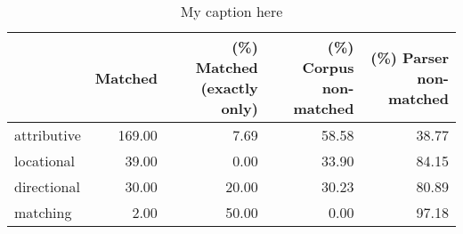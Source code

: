 \begin{table}[!ht]
\centering
\begin{tabular}{lrrrr}
\toprule
{} &  Matched &  (\%) Matched (exactly only) &  (\%) Corpus non-matched &  (\%) Parser non-matched \\
\midrule
attributive &   169.00 &                        7.69 &                   58.58 &                   38.77 \\
locational  &    39.00 &                        0.00 &                   33.90 &                   84.15 \\
directional &    30.00 &                       20.00 &                   30.23 &                   80.89 \\
matching    &     2.00 &                       50.00 &                    0.00 &                   97.18 \\
\bottomrule
\end{tabular}
\caption{My caption here}
\label{tab:RELATIONAL-oe-relative}
\end{table}